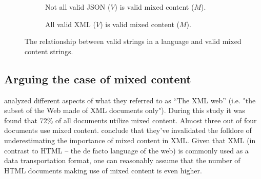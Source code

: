 \documentclass{scrreprt}
\begin{document}
\begin{figure}
\centering
\begin{subfigure}{.4\textwidth}
  \centering

  \caption{Not all valid JSON ($V$) is valid mixed content ($M$).}
  \label{fig:mixed-content-venn-json}
  
\end{subfigure}%
\begin{subfigure}{.4\textwidth}
  \centering

  \caption{All valid XML ($V$) is valid mixed content ($M$).}
  \label{fig:mixed-content-venn-json}
  
\end{subfigure}
\caption{The relationship between valid strings in a language and valid mixed content strings.}
\label{fig:mixed-content-venn}
\end{figure}









\subsection{Arguing the case of mixed content}
\citet*{mignet} analyzed different aspects of what they referred to as ``The XML web'' (i.e. "the subset of the Web made of XML documents only"). During this study it was found that 72\% of all documents utilize mixed content. Almost three out of four documents use mixed content. \citet{mignet} conclude that they've invalidated the folklore of underestimating the importance of mixed content in XML. Given that XML (in contrast to HTML -- the de facto language of the web) is commonly used as a data transportation format, one can reasonably assume that the number of HTML documents making use of mixed content is even higher.
\end{document}
